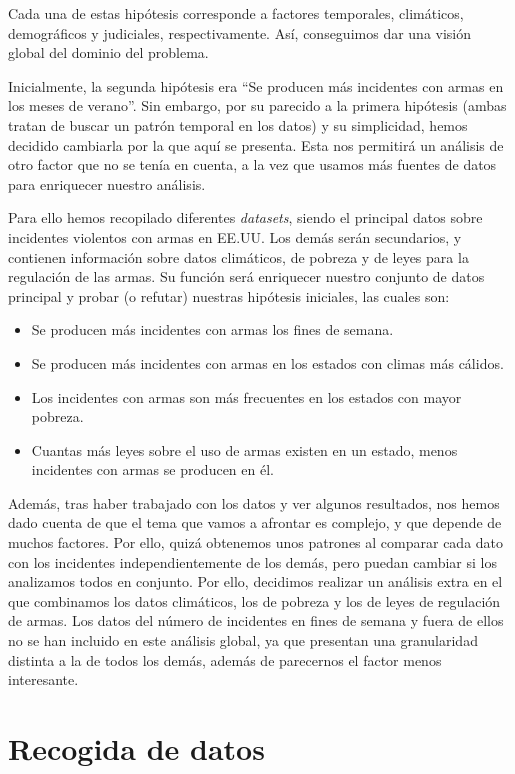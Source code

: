 \documentclass[11pt,a4paper]{article}
\begin{document}
Cada una de estas hipótesis corresponde a factores temporales, climáticos, demográficos y judiciales, respectivamente. Así, conseguimos dar una visión global del dominio del problema.

Inicialmente, la segunda hipótesis era ``Se producen más incidentes con armas en los meses de verano''. Sin embargo, por su parecido a la primera hipótesis (ambas tratan de buscar un patrón temporal en los datos) y su simplicidad, hemos decidido cambiarla por la que aquí se presenta. Esta nos permitirá un análisis de otro factor que no se tenía en cuenta, a la vez que usamos más fuentes de datos para enriquecer nuestro análisis.

Para ello hemos recopilado diferentes \textit{datasets}, siendo el principal datos sobre incidentes violentos con armas en EE.UU. Los demás serán secundarios, y contienen información sobre datos climáticos, de pobreza y de leyes para la regulación de las armas. Su función será enriquecer nuestro conjunto de datos principal y probar (o refutar) nuestras hipótesis iniciales, las cuales son:

\begin{itemize}
    \item Se producen más incidentes con armas los fines de semana.
    \item Se producen más incidentes con armas en los estados con climas más cálidos.
    \item Los incidentes con armas son más frecuentes en los estados con mayor pobreza.
    \item Cuantas más leyes sobre el uso de armas existen en un estado, menos incidentes con armas se producen en él.
\end{itemize}

Además, tras haber trabajado con los datos y ver algunos resultados, nos hemos dado cuenta de que el tema que vamos a afrontar es complejo, y que depende de muchos factores. Por ello, quizá obtenemos unos patrones al comparar cada dato con los incidentes independientemente de los demás, pero puedan cambiar si los analizamos todos en conjunto. Por ello, decidimos realizar un análisis extra en el que combinamos los datos climáticos, los de pobreza y los de leyes de regulación de armas. Los datos del número de incidentes en fines de semana y fuera de ellos no se han incluido en este análisis global, ya que presentan una granularidad distinta a la de todos los demás, además de parecernos el factor menos interesante.

\section{Recogida de datos}
\end{document}
